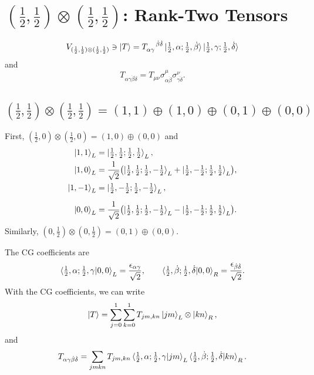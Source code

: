\section{\texorpdfstring{$(\frac{1}{2}, \frac{1}{2}) \otimes (\frac{1}{2}, \frac{1}{2})$: Rank-Two Tensors}{(1/2,1/2) x (1/2,1/2): Rank-Two Tensors}}
\begin{equation}
    V_{(\frac{1}{2}, \frac{1}{2}) \otimes (\frac{1}{2}, \frac{1}{2})} \ni \ket{T} = \tensor{T}{_\alpha_\gamma^{\dot\beta}^{\dot\delta}} \ket{\tfrac{1}{2}, \alpha; \tfrac{1}{2}, \dot\beta} \ket{\tfrac{1}{2}, \gamma; \tfrac{1}{2}, \dot\delta}
\end{equation}
and
\begin{equation}
    T_{\alpha \gamma \dot\beta \dot\delta} = T_{\mu \nu} \sigma^\mu_{\alpha \dot\beta} \sigma^\nu_{\gamma \dot\delta}.
\end{equation}
\subsection{\texorpdfstring{$(\frac{1}{2}, \frac{1}{2}) \otimes (\frac{1}{2}, \frac{1}{2}) = (1, 1) \oplus (1, 0) \oplus (0, 1) \oplus (0, 0)$}{(1/2,1/2) x (1/2,1/2) = (1,1) + (1,0) + (0,1) + (0,0)}}
First, $(\frac{1}{2}, 0) \otimes (\frac{1}{2}, 0) = (1, 0) \oplus (0, 0)$ and
\begin{align}
    \ket{1, 1}_L & = \ket{\tfrac{1}{2}, \tfrac{1}{2}; \tfrac{1}{2}, \tfrac{1}{2}}_L, \notag \\
    \ket{1, 0}_L & = \frac{1}{\sqrt{2}} \bigl( \ket{\tfrac{1}{2}, \tfrac{1}{2}; \tfrac{1}{2}, - \tfrac{1}{2}}_L + \ket{\tfrac{1}{2}, - \tfrac{1}{2}; \tfrac{1}{2}, \tfrac{1}{2}}_L \bigr), \notag \\
    \ket{1, - 1}_L & = \ket{\tfrac{1}{2}, - \tfrac{1}{2}; \tfrac{1}{2}, - \tfrac{1}{2}}_L, \notag \\[2mm]
    \ket{0, 0}_L & = \frac{1}{\sqrt{2}} \bigl( \ket{\tfrac{1}{2}, \tfrac{1}{2}; \tfrac{1}{2}, - \tfrac{1}{2}}_L - \ket{\tfrac{1}{2}, - \tfrac{1}{2}; \tfrac{1}{2}, \tfrac{1}{2}}_L \bigr).
\end{align}
Similarly, $(0, \frac{1}{2}) \otimes (0, \frac{1}{2}) = (0, 1) \oplus (0, 0)$.

The CG coefficients are
\begin{equation}
    \braket{\tfrac{1}{2}, \alpha; \tfrac{1}{2}, \gamma | 0, 0}_L = \frac{\epsilon_{\alpha \gamma}}{\sqrt{2}}, \qquad \braket{\tfrac{1}{2}, \dot\beta; \tfrac{1}{2}, \dot\delta | 0, 0}_R = \frac{\epsilon_{\dot\beta \dot\delta}}{\sqrt{2}}.
\end{equation}
With the CG coefficients, we can write
\begin{equation}
    \ket{T} = \sum_{j = 0}^1 \sum_{k = 0}^1 T_{j m, k n} \ket{j m}_L \otimes \ket{k n}_R,
\end{equation}
and
\begin{equation}
    T_{\alpha \gamma \dot\beta \dot\delta} = \sum_{j m k n} T_{j m, k n} \braket{\tfrac{1}{2}, \alpha; \tfrac{1}{2}, \gamma | j m}_L \braket{\tfrac{1}{2}, \dot\beta; \tfrac{1}{2}, \dot\delta | k n}_R. \label{From (A,B) to spinor indices}
\end{equation}
